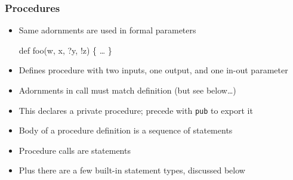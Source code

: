 \documentclass[12pt]{beamer}
\begin{document}
\begin{frame}[fragile]
\frametitle{Procedures}
\begin{itemize}
\item Same adornments are used in formal parameters \\[-1ex]
  \begin{minipage}{0.95\linewidth}
    \begin{block}{}
\begin{semiverbatim}
def foo(w, x, \alert{?}y, \alert{!}z) \{
    \ldots
\}
\end{semiverbatim}
    \end{block}
  \end{minipage}
\item Defines procedure with two
  inputs, one output, and one in-out parameter
\item Adornments in call must match definition (but see below\ldots)
\item This declares a private procedure; precede with \alert{\texttt{pub}}
  to export it
\item Body of a procedure definition is a sequence of
  statements
\item Procedure calls are statements
\item Plus there are a few built-in statement types, discussed below
\end{itemize}
\end{frame}
\end{document}
